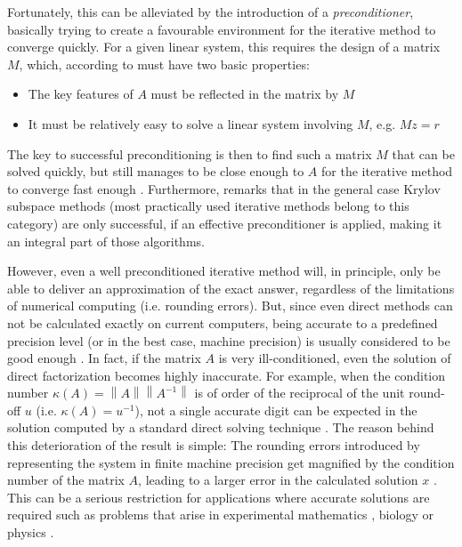 Fortunately, this can be alleviated by the introduction of a \textit{preconditioner}, basically trying to create a favourable environment for the iterative method to converge quickly. For a given linear system, this requires the design of  a matrix $M$, which, according to \cite{golub_matrix_2013} must have two basic properties:
\begin{itemize}
    \item The key features of $A$ must be reflected in the matrix by $M$
    \item It must be relatively easy to solve a linear system involving $M$, e.g. $Mz=r$
\end{itemize}
The key to successful preconditioning is then to find such a matrix $M$ that can be solved quickly, but still manages to be close enough to $A$ for the iterative method to converge fast enough \cite{trefethen_numerical_1997}. Furthermore, \cite{golub_matrix_2013} remarks that in the general case Krylov subspace methods (most practically used iterative methods belong to this category) are only successful, if an effective preconditioner is applied, making it an integral part of those algorithms.

However, even a well preconditioned iterative method will, in principle, only be able to deliver an approximation of the exact answer, regardless of the limitations of numerical computing (i.e. rounding errors). But, since even direct methods can not be calculated exactly on current computers, being accurate to a predefined precision level (or in the best case, machine precision) is usually considered to be good enough \cite{trefethen_numerical_1997}. In fact, if the matrix $A$ is very ill-conditioned, even the solution of direct factorization becomes highly inaccurate. For example, when the condition number $\kappa(A) = \left\| A \right\| \left\| A^{-1} \right\|$ is of order of the reciprocal of the unit round-off $u$ (i.e. $\kappa(A) = u^{-1}$), not a single accurate digit can be expected in the solution computed by a standard direct solving technique \cite{carson_new_2017}. The reason behind this deterioration of the result is simple: The rounding errors introduced by representing the system in finite machine precision get magnified by the condition number of the matrix $A$, leading to a larger error in the calculated solution $x$ \cite{buttari_mixed_2007}. 
This can be a serious restriction for applications where accurate solutions are required such as problems that arise in experimental mathematics \cite{sarra_radial_2011}, biology \cite{ma_solving_2015, ma_reliable_2017} or physics \cite{bailey_high-precision_2015}.
